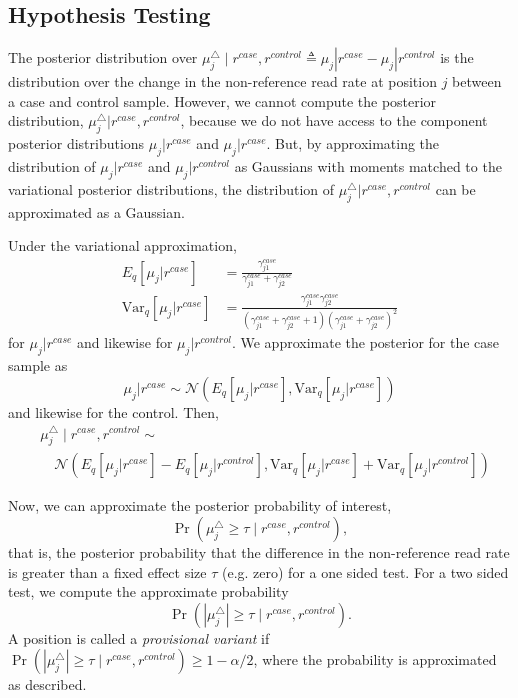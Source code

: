 \documentclass{bmcart}
\begin{document}
\subsection{Hypothesis Testing}
The posterior distribution over $\mu_j^{\triangle} \mid r^{case}, r^{control} \triangleq \mu_j|r^{case} - \mu_j|r^{control}$ is the distribution over the change in the non-reference read rate at position $j$ between a case and control sample.
However, we cannot compute the posterior distribution, $\mu_j^{\triangle} | r^{case}, r^{control}$, because we do not have access to the component posterior distributions $\mu_j|r^{case}$ and $\mu_j|r^{case}$.
But, by approximating the distribution of $\mu_j|r^{case}$ and $\mu_j|r^{control}$ as Gaussians with moments matched to the variational posterior distributions, the distribution of $\mu_j^{\triangle} | r^{case}, r^{control}$ can be approximated as a Gaussian.

Under the variational approximation,
\begin{align}
  E_q[\mu_j|r^{case}] &= \frac{\gamma_{j1}^{case}}{\gamma_{j1}^{case} + \gamma_{j2}^{case}}
  \\
  \text{Var}_q[\mu_j|r^{case}] &= \frac{\gamma_{j1}^{case} \gamma_{j2}^{case}}{(\gamma_{j1}^{case} + \gamma_{j2}^{case} + 1)(\gamma_{j1}^{case} + \gamma_{j2}^{case})^2}
\end{align}
for $\mu_j|r^{case}$ and likewise for $\mu_j|r^{control}$.
We approximate the posterior for the case sample as
\begin{equation}
  \mu_j | r^{case} \sim \mathcal{N}(E_q[\mu_j|r^{case}], \text{Var}_q[\mu_j|r^{case}])
\end{equation}
and likewise for the control.
Then,
\begin{equation}
\begin{split}
  &\mu_j^{\triangle} \mid r^{case}, r^{control} \sim \\
  &\quad \mathcal{N}(E_q[\mu_j|r^{case}] - E_q[\mu_j|r^{control}], \text{Var}_q[\mu_j|r^{case}] + \text{Var}_q[\mu_j|r^{control}])
\end{split}
\end{equation}

Now, we can approximate the posterior probability of interest,
\begin{equation}
  \Pr( \mu_j^{\triangle} \geq \tau \mid r^{case}, r^{control} ),
\end{equation}
that is, the posterior probability that the difference in the non-reference read rate is greater than a fixed effect size $\tau$ (e.g. zero) for a one sided test.
For a two sided test, we compute the approximate probability
\begin{equation}
  \Pr( | \mu_j^{\triangle} | \geq \tau \mid r^{case}, r^{control}).
\end{equation}
A position is called a \textit{provisional variant} if $\Pr( | \mu_j^{\triangle} | \geq \tau \mid r^{case}, r^{control}) \geq 1-\alpha/2$, where the probability is approximated as described.
\end{document}
